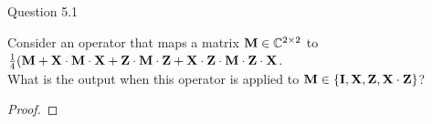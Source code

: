 \begin{solution}{Question 5.1}\label{ques:5.1}
    \begin{question}
    Consider an operator that maps a matrix $\mathbf{M} \in \mathbb{C}^{2\times 2}$ to \\
    $\frac{1}{4}(\mathbf{M} + \mathbf{X} \cdot \mathbf{M} \cdot \mathbf{X} + \mathbf{Z} \cdot \mathbf{M} \cdot \mathbf{Z}+ \mathbf{X} \cdot \mathbf{Z} \cdot \mathbf{M} \cdot \mathbf{Z} \cdot \mathbf{X}$.\\
    What is the output when this operator is applied to $\mathbf{M} \in \{\mathbf{I}, \mathbf{X}, \mathbf{Z}, \mathbf{X} \cdot \mathbf{Z}\}$?
    \end{question}
    \tcblower{}
    \begin{proof}


    
    \end{proof}
\end{solution}
